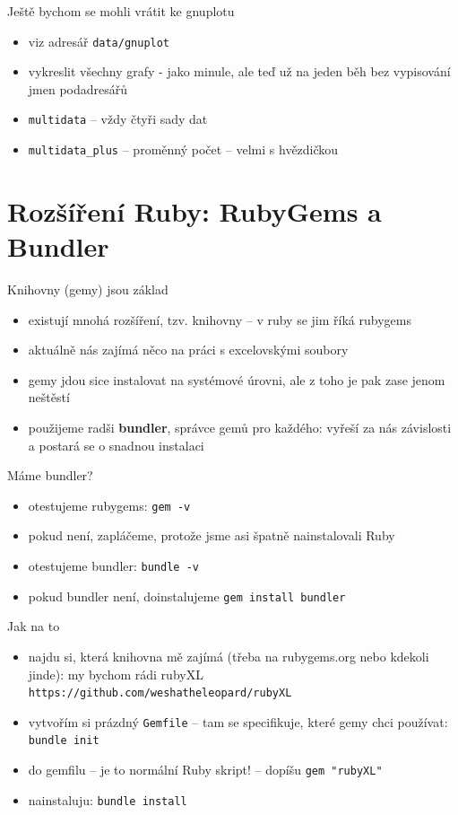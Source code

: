 \documentclass{beamer}
\begin{document}
\begin{frame}{Ještě bychom se mohli vrátit ke gnuplotu}
  \begin{itemize}
    \item viz adresář \texttt{data/gnuplot}
    \item vykreslit všechny grafy - jako minule, ale teď už na jeden běh bez vypisování jmen podadresářů
    \item \texttt{multidata} -- vždy čtyři sady dat
    \item \texttt{multidata\_plus} -- proměnný počet -- velmi s hvězdičkou
  \end{itemize}
\end{frame}

\section{Rozšíření Ruby: RubyGems a Bundler}

\begin{frame}{Knihovny (gemy) jsou základ}
  \begin{itemize}
    \item existují mnohá rozšíření, tzv. knihovny -- v ruby se jim říká rubygems
    \item aktuálně nás zajímá něco na práci s excelovskými soubory
    \item gemy jdou sice instalovat na systémové úrovni, ale z toho je pak zase jenom neštěstí
    \item použijeme radši \textbf{bundler}, správce gemů pro každého: vyřeší za nás závislosti a postará se o snadnou instalaci
  \end{itemize}
\end{frame}

\begin{frame}{Máme bundler?}
  \begin{itemize}
    \item otestujeme rubygems: \texttt{gem -v}
    \item pokud není, zapláčeme, protože jsme asi špatně nainstalovali Ruby
    \item otestujeme bundler: \texttt{bundle -v}
    \item pokud bundler není, doinstalujeme \texttt{gem~install~bundler}
  \end{itemize}
\end{frame}

\begin{frame}{Jak na to}
  \begin{itemize}
    \item najdu si, která knihovna mě zajímá (třeba na rubygems.org nebo kdekoli jinde): my bychom rádi rubyXL \texttt{https://github.com/weshatheleopard/rubyXL}
    \item vytvořím si prázdný \texttt{Gemfile} -- tam se specifikuje, které gemy chci používat: \texttt{bundle init}
    \item do gemfilu -- je to normální Ruby skript! -- dopíšu \texttt{gem~"rubyXL"}
    \item nainstaluju: \texttt{bundle install}
  \end{itemize}
\end{frame}
\end{document}
